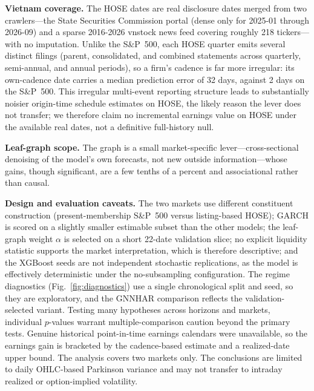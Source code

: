 \documentclass[runningheads,a4paper]{llncs}
\begin{document}
\noindent\textbf{Vietnam coverage.} The HOSE dates are real disclosure dates merged from two crawlers---the
State Securities Commission portal (dense only for 2025-01 through 2026-09) and a sparse 2016-2026 vnstock
news feed covering roughly 218 tickers---with no imputation. Unlike the S\&P~500, each HOSE quarter emits
several distinct filings (parent, consolidated, and combined statements across quarterly, semi-annual, and
annual periods), so a firm's cadence is far more irregular: its own-cadence date carries a median
prediction error of 32 days, against 2 days on the S\&P~500. This irregular multi-event reporting structure
leads to substantially noisier origin-time schedule estimates on HOSE, the likely reason the lever does not
transfer; we therefore claim no incremental earnings value on HOSE under the available real dates, not a
definitive full-history null.

\noindent\textbf{Leaf-graph scope.} The graph is a small market-specific lever---cross-sectional denoising
of the model's own forecasts, not new outside information---whose gains, though significant, are a few
tenths of a percent and associational rather than causal.

\noindent\textbf{Design and evaluation caveats.} The two markets use different constituent construction
(present-membership S\&P~500 versus listing-based HOSE); GARCH is scored on a slightly smaller estimable
subset than the other models; the leaf-graph weight $\alpha$ is selected on a short 22-date validation
slice; no explicit liquidity statistic supports the market interpretation, which is therefore descriptive;
and the XGBoost seeds are not independent stochastic replications, as the model is effectively deterministic
under the no-subsampling configuration. The regime diagnostics (Fig.~\ref{fig:diagnostics}) use a single
chronological split and seed, so they are exploratory, and the GNNHAR comparison reflects the
validation-selected variant. Testing many hypotheses across horizons and markets, individual $p$-values
warrant multiple-comparison caution beyond the primary tests. Genuine historical point-in-time earnings
calendars were unavailable, so the earnings gain is bracketed by the cadence-based estimate and a
realized-date upper bound. The analysis covers two markets only. The conclusions are limited to daily
OHLC-based Parkinson variance and may not transfer to intraday realized or option-implied volatility.
\end{document}
